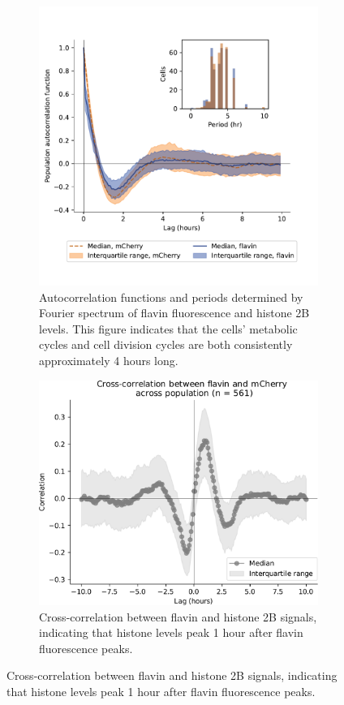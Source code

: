 \begin{figure}
\begin{subfigure}[htpb]{1.0\textwidth}
  \end{subfigure}
  \begin{subfigure}[t]{0.4\textwidth}
   \centering
   \includegraphics[width=\textwidth]{htb2mCherry_31594_12.pdf}
   \caption{
     Autocorrelation functions and periods determined by Fourier spectrum of flavin fluorescence and histone 2B levels.
     This figure indicates that the cells' metabolic cycles and cell division cycles are both consistently approximately 4 hours long.
   }
   \label{fig:biology-pyruvate-acf}
  \end{subfigure}%
  \begin{subfigure}[t]{0.4\textwidth}
   \centering
   \includegraphics[width=\textwidth]{pyruvate_xcf_edit.pdf}
   \caption{
    Cross-correlation between flavin and histone 2B signals, indicating that histone levels peak 1 hour after flavin fluorescence peaks.
   }
   \label{fig:biology-pyruvate-xcf}
  \end{subfigure}


\end{figure}
